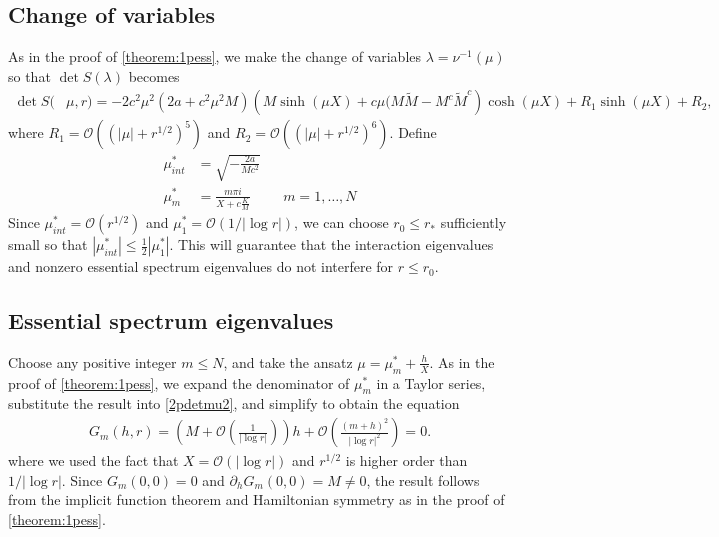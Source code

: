 \documentclass[10pt,reqno]{amsart}
\theoremstyle{plain}
\theoremstyle{definition}
\theoremstyle{remark}
\numberwithin{theorem}{section}
\numberwithin{equation}{section}
\begin{document}
\subsection{Change of variables}

As in the proof of \cref{theorem:1pess}, we make the change of variables $\lambda = \nu^{-1}(\mu)$ so that $\det S(\lambda)$ becomes 
\begin{equation}\label{2pdetmu2}
\begin{aligned}
\det S(&\mu, r) = -2 c^2 \mu^2 (2a + c^2 \mu^2 M) \left( M \sinh(\mu X) + c \mu (M \tilde{M} - M^c \tilde{M}^c\right)\cosh(\mu X) + R_1 \sinh(\mu X) + R_2,
\end{aligned}
\end{equation}
where $R_1 = \mathcal{O}((|\mu| + r^{1/2})^5)$ and $R_2 = \mathcal{O}((|\mu| + r^{1/2})^6)$. Define
\begin{align}
\mu^*_{int} &= \sqrt{-\frac{2 a}{M c^2}} \label{defmustarint} \\
\mu^*_m &= \frac{m \pi i}{X + c \frac{K}{M}}  && m = 1, \dots, N \label{defmustaress}
\end{align}
Since $\mu^*_{int} = \mathcal{O}(r^{1/2})$ and $\mu^*_1 = \mathcal{O}(1/|\log r|)$, we can choose $r_0 \leq r_*$ sufficiently small so that $|\mu^*_{int}| \leq \frac{1}{2} |\mu^*_1|$. This will guarantee that the interaction eigenvalues and nonzero essential spectrum eigenvalues do not interfere for $r \leq r_0$.

\subsection{Essential spectrum eigenvalues}

Choose any positive integer $m \leq N$, and take the ansatz $\mu = \mu^*_m + \frac{h}{X}$. As in the proof of \cref{theorem:1pess}, we expand the denominator of $\mu^*_m$ in a Taylor series, substitute the result into \cref{2pdetmu2}, and simplify to obtain the equation
\begin{align*}
G_m(h, r) = \left( M + \mathcal{O}\left( \frac{1}{|\log r|} \right)\right) h + \mathcal{O}\left( \frac{(m+h)^2}{|\log r|^2} \right) = 0.
\end{align*}
where we used the fact that $X = \mathcal{O}(|\log r|)$ and $r^{1/2}$ is higher order than $1/|\log r|$. Since $G_m(0,0) = 0$ and $\partial_h G_m(0,0) = M \neq 0$, the result follows from the implicit function theorem and Hamiltonian symmetry as in the proof of \cref{theorem:1pess}.
\end{document}
